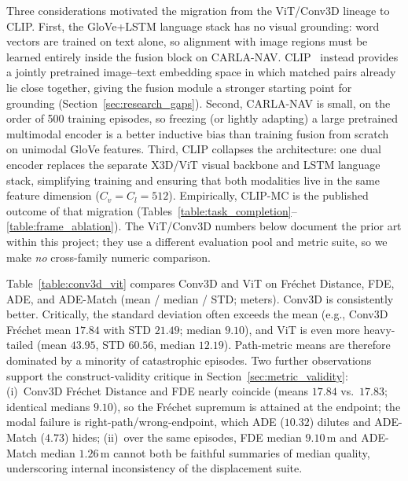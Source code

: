 Three considerations motivated the migration from the ViT/Conv3D lineage to CLIP. First, the GloVe+LSTM language stack has no visual grounding: word vectors are trained on text alone, so alignment with image regions must be learned entirely inside the fusion block on CARLA-NAV. CLIP~\cite{radford2021learning} instead provides a jointly pretrained image--text embedding space in which matched pairs already lie close together, giving the fusion module a stronger starting point for grounding (Section~\ref{sec:research_gaps}). Second, CARLA-NAV is small, on the order of 500 training episodes, so freezing (or lightly adapting) a large pretrained multimodal encoder is a better inductive bias than training fusion from scratch on unimodal GloVe features. Third, CLIP collapses the architecture: one dual encoder replaces the separate X3D/ViT visual backbone and LSTM language stack, simplifying training and ensuring that both modalities live in the same feature dimension ($C_v=C_l=512$). Empirically, CLIP-MC is the published outcome of that migration (Tables~\ref{table:task_completion}--\ref{table:frame_ablation}). The ViT/Conv3D numbers below document the prior art within this project; they use a different evaluation pool and metric suite, so we make \emph{no} cross-family numeric comparison.

Table~\ref{table:conv3d_vit} compares Conv3D and ViT on Fr\'{e}chet Distance, FDE, ADE, and ADE-Match (mean / median / STD; meters). Conv3D is consistently better. Critically, the standard deviation often exceeds the mean (e.g., Conv3D Fr\'{e}chet mean $17.84$ with STD $21.49$; median $9.10$), and ViT is even more heavy-tailed (mean $43.95$, STD $60.56$, median $12.19$). Path-metric means are therefore dominated by a minority of catastrophic episodes. Two further observations support the construct-validity critique in Section~\ref{sec:metric_validity}: (i)~Conv3D Fr\'{e}chet Distance and FDE nearly coincide (means $17.84$ vs.\ $17.83$; identical medians $9.10$), so the Fr\'{e}chet supremum is attained at the endpoint; the modal failure is right-path/wrong-endpoint, which ADE ($10.32$) dilutes and ADE-Match ($4.73$) hides; (ii)~over the same episodes, FDE median $9.10\,\mathrm{m}$ and ADE-Match median $1.26\,\mathrm{m}$ cannot both be faithful summaries of median quality, underscoring internal inconsistency of the displacement suite.

